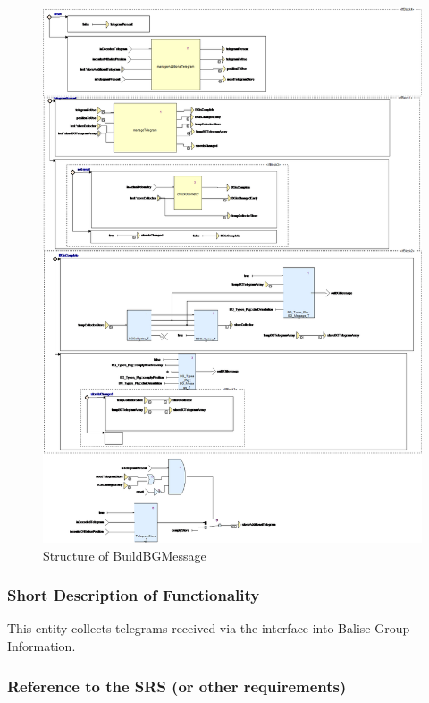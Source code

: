 \documentclass{template/openetcs_report}
\begin{document}
\begin{figure}[hbtp]
\centering
\includegraphics[width=\textwidth]{../images/BuildBGMessage_diagram.png}
\caption{Structure of BuildBGMessage}
\end{figure}

\subsubsection{Short Description of Functionality}
This entity collects telegrams received via the interface into Balise Group Information.
	
\subsubsection{Reference to the SRS (or other requirements)}
\end{document}
